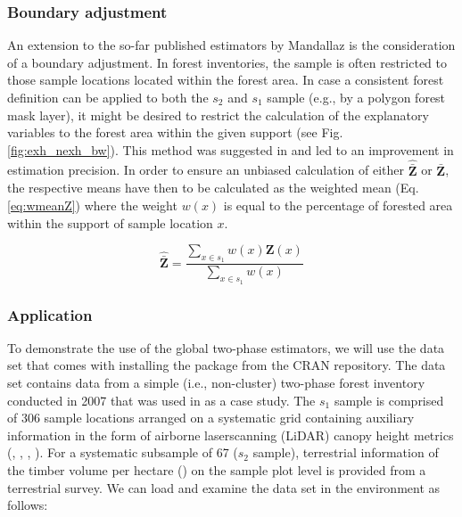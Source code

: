 \subsubsection{Boundary adjustment}

An extension to the so-far published estimators by Mandallaz is the consideration of a boundary adjustment. In forest inventories, the sample is often restricted to those sample locations located within the forest area. In case a consistent forest definition can be applied to both the $s_2$ and $s_1$ sample (e.g., by a polygon forest mask layer), it might be desired to restrict the calculation of the explanatory variables to the forest area within the given support (see Fig. \ref{fig:exh_nexh_bw}). This method was suggested in \citet{mandallaz2013b} and led to an improvement in estimation precision. In order to ensure an unbiased calculation of either $\hat{\bar{\pmb{Z}}}$ or $\bar{\pmb{Z}}$, the respective means have then to be calculated as the weighted mean (Eq. \ref{eq:wmeanZ}) where the weight $w(x)$ is equal to the percentage of forested area within the support of sample location $x$.

\begin{equation}\label{eq:wmeanZ}
  \hat{\bar{\pmb{Z}}}=\frac{\sum_{x\in{s_1}}w(x)\pmb{Z}(x)}{\sum_{x\in{s_1}}w(x)}
\end{equation}

\subsubsection{Application}

To demonstrate the use of the global two-phase estimators, we will use the  data set that comes with installing the package from the CRAN repository. The data set contains data from a simple (i.e., non-cluster) two-phase forest inventory conducted in 2007 that was used in \citet{mandallaz2013b} as a case study. The $s_1$ sample is comprised of 306 sample locations arranged on a systematic grid containing auxiliary information in the form of airborne laserscanning (LiDAR) canopy height metrics (, , , ). For a systematic subsample of 67 ($s_2$ sample), terrestrial information of the timber volume per hectare () on the sample plot level is provided from a terrestrial survey. We can load  and examine the  data set in the  environment as follows:

